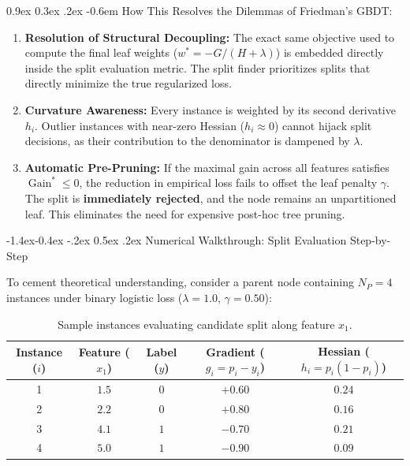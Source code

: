 \documentclass[11pt,a4paper]{article}
\makeatletter
\renewcommand\subsection{\@startsection{subsection}{2}{\z@}%
                                     {-1.4ex\@plus -0.4ex \@minus -.2ex}%
                                     {0.5ex \@plus .2ex}%
                                     {\normalfont\normalsize\bfseries}}
\renewcommand\paragraph{\@startsection{paragraph}{4}{\z@}%
                                     {0.9ex \@plus0.3ex \@minus.2ex}%
                                     {-0.6em}%
                                     {\normalfont\normalsize\bfseries}}
\newcommand{\Gain}{\operatorname{Gain}}
\makeatother
\begin{document}
\paragraph{How This Resolves the Dilemmas of Friedman's GBDT:}
\begin{enumerate}
    \item \textbf{Resolution of Structural Decoupling:} The exact same objective used to compute the final leaf weights ($w^* = -G/(H+\lambda)$) is embedded directly inside the split evaluation metric. The split finder prioritizes splits that directly minimize the true regularized loss.
    \item \textbf{Curvature Awareness:} Every instance is weighted by its second derivative $h_i$. Outlier instances with near-zero Hessian ($h_i \approx 0$) cannot hijack split decisions, as their contribution to the denominator is dampened by $\lambda$.
    \item \textbf{Automatic Pre-Pruning:} If the maximal gain across all features satisfies $\Gain^* \le 0$, the reduction in empirical loss fails to offset the leaf penalty $\gamma$. The split is \textbf{immediately rejected}, and the node remains an unpartitioned leaf. This eliminates the need for expensive post-hoc tree pruning.
\end{enumerate}

\subsection{Numerical Walkthrough: Split Evaluation Step-by-Step}

To cement theoretical understanding, consider a parent node containing $N_P = 4$ instances under binary logistic loss ($\lambda = 1.0$, $\gamma = 0.50$):

\begin{table}[!htbp]
\centering
\small
\begin{tabular}{@{}ccccc@{}}
\toprule
\textbf{Instance ($i$)} & \textbf{Feature ($x_1$)} & \textbf{Label ($y$)} & \textbf{Gradient ($g_i = p_i - y_i$)} & \textbf{Hessian ($h_i = p_i(1-p_i)$)} \\ \midrule
1                       & $1.5$                     & $0$                  & $+0.60$                               & $0.24$                                \\
2                       & $2.2$                     & $0$                  & $+0.80$                               & $0.16$                                \\
3                       & $4.1$                     & $1$                  & $-0.70$                               & $0.21$                                \\
4                       & $5.0$                     & $1$                  & $-0.90$                               & $0.09$                                \\ \bottomrule
\end{tabular}
\caption{Sample instances evaluating candidate split along feature $x_1$.}
\label{tab:xgboost_num_walkthrough}
\end{table}
\end{document}
